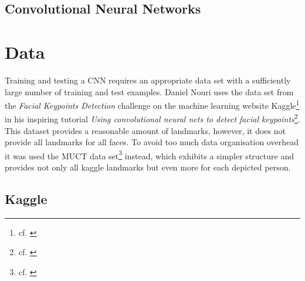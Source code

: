 \documentclass[11pt, a4paper]{article}
\begin{document}
\subsection{Convolutional Neural Networks}

\newpage

\section{Data}

Training and testing a \ac{CNN} requires an appropriate data set with a sufficiently large number of training and test examples. Daniel Nouri uses the data set from the \emph{Facial Keypoints Detection} challenge on the machine learning website Kaggle\footnote{cf. \cite{kaggle}} in his inspiring tutorial \emph{Using convolutional neural nets to detect facial keypoints}\footnote{cf. \cite{nouri-tutorial}}. This dataset provides a reasonable amount of landmarks, however, it does not provide all landmarks for all faces. To avoid too much data organisation overhead it was used the \ac{MUCT} data set\footnote{cf. \cite{muct}} instead, which exhibits a simpler structure and provides not only all kaggle landmarks but even more for each depicted person.

\subsection{Kaggle}
\end{document}
